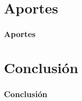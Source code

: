 \documentclass{beamer}
\begin{document}
\section{Aportes}
\begin{frame}
\frametitle{Aportes}

\end{frame}

\section{Conclusión}
\begin{frame}
\frametitle{Conclusión}

\end{frame}

\ThankYouFrame
\end{document}
